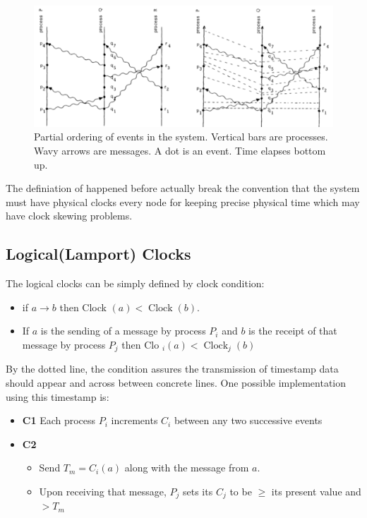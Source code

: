 \documentclass[acmlarge]{acmart}
\begin{document}
\begin{figure}[h]
  \centering
  \includegraphics[width=\linewidth]{partial_order.png}
  \caption{Partial ordering of events in the system. Vertical bars are processes.
    Wavy arrows are messages. A dot is an event. Time elapses bottom up.}
\end{figure}

The definiation of happened before actually break the convention that the
system must have physical clocks every node for keeping precise physical
time which may have clock skewing problems.

\subsection{Logical(Lamport) Clocks}
The logical clocks can be simply defined by clock condition:
\begin{itemize}
  \item if $a \rightarrow b$ then Clock $(a)<\operatorname{Clock}(b)$.
  \item If $a$ is the sending of a message by process $P_{i}$ and $b$ is the receipt
        of that message by process $P_{j}$ then Clo ${ }_{i}(a)<\operatorname{Clock}_{j}(b)$
\end{itemize}
By the dotted line, the condition assures the transmission of timestamp data should appear and across between concrete lines. One possible
implementation using this timestamp is:

\begin{itemize}
  \item \textbf{C1} Each process $P_{i}$ increments $C_{i}$ between any two successive events
  \item \textbf{C2} \begin{itemize}
          \item Send $T_{m}=C_{i}(a)$ along with the message from $a$.
          \item Upon receiving that message, $P_{j}$ sets its $C_{j}$ to be $\geq$ its present value and $>T_{m}$
        \end{itemize}
\end{itemize}
\end{document}
